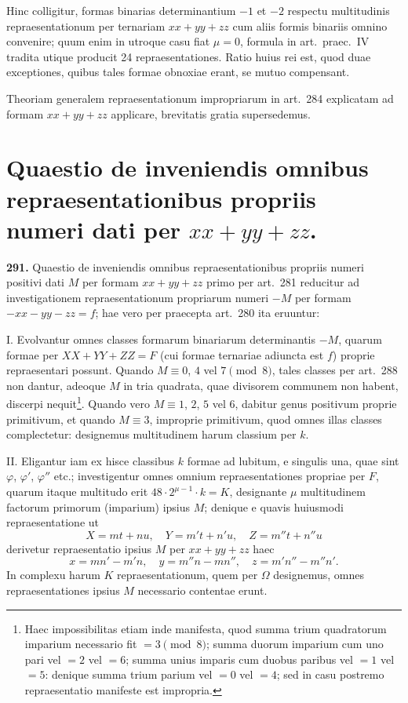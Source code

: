 \documentclass[12pt,a4paper]{article}
\theoremstyle{plain}
\theoremstyle{definition}
\theoremstyle{remark}
\begin{document}
Hinc colligitur, formas binarias determinantium $-1$ et $-2$ respectu multitudinis repraesentationum per ternariam $xx + yy + zz$ cum aliis formis binariis omnino convenire; quum enim in utroque casu fiat $\mu = 0$, formula in art.~praec.~IV tradita utique producit 24 repraesentationes. Ratio huius rei est, quod duae exceptiones, quibus tales formae obnoxiae erant, se mutuo compensant.

Theoriam generalem repraesentationum impropriarum in art.~284 explicatam ad formam $xx + yy + zz$ applicare, brevitatis gratia supersedemus.


\section*{Quaestio de inveniendis omnibus repraesentationibus propriis numeri dati per $xx + yy + zz$.}

\textbf{291.} Quaestio de inveniendis omnibus repraesentationibus propriis numeri positivi dati $M$ per formam $xx + yy + zz$ primo per art.~281 reducitur ad investigationem repraesentationum propriarum numeri $-M$ per formam $-xx - yy - zz = f$; hae vero per praecepta art.~280 ita eruuntur:

\textsc{I.} Evolvantur omnes classes formarum binariarum determinantis $-M$, quarum formae per $XX + YY + ZZ = F$ (cui formae ternariae adiuncta est $f$) proprie repraesentari possunt. Quando $M \equiv 0$, $4$ vel $7 \pmod{8}$, tales classes per art.~288 non dantur, adeoque $M$ in tria quadrata, quae divisorem communem non habent, discerpi nequit\footnote{Haec impossibilitas etiam inde manifesta, quod summa trium quadratorum imparium necessario fit $= 3 \pmod{8}$; summa duorum imparium cum uno pari vel $= 2$ vel $= 6$; summa unius imparis cum duobus paribus vel $= 1$ vel $= 5$: denique summa trium parium vel $= 0$ vel $= 4$; sed in casu postremo repraesentatio manifeste est impropria.}. Quando vero $M \equiv 1$, $2$, $5$ vel $6$, dabitur genus positivum proprie primitivum, et quando $M \equiv 3$, improprie primitivum, quod omnes illas classes complectetur: designemus multitudinem harum classium per $k$.

\textsc{II.} Eligantur iam ex hisce classibus $k$ formae ad lubitum, e singulis una, quae sint $\varphi$, $\varphi'$, $\varphi''$ etc.; investigentur omnes omnium repraesentationes propriae per $F$, quarum itaque multitudo erit $48 \cdot 2^{\mu-1} \cdot k = K$, designante $\mu$ multitudinem factorum primorum (imparium) ipsius $M$; denique e quavis huiusmodi repraesentatione ut
\[
X = mt + nu,\quad Y = m't + n'u,\quad Z = m''t + n''u
\]
derivetur repraesentatio ipsius $M$ per $xx + yy + zz$ haec
\[
x = mn' - m'n,\quad y = m''n - mn'',\quad z = m'n'' - m''n'.
\]
In complexu harum $K$ repraesentationum, quem per $\Omega$ designemus, omnes repraesentationes ipsius $M$ necessario contentae erunt.
\end{document}
